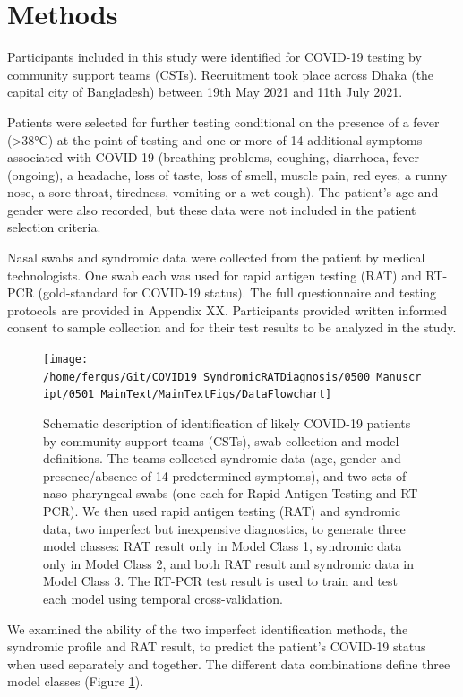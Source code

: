\documentclass[]{elsarticle} %
\begin{document}
\hypertarget{methods}{%
\section{Methods}\label{methods}}

Participants included in this study were identified for COVID-19 testing by community support teams (CSTs).
Recruitment took place across Dhaka (the capital city of Bangladesh) between 19th May 2021 and 11th July 2021.

Patients were selected for further testing conditional on the presence of a fever (\textgreater38°C) at the point of testing and one or more of 14 additional symptoms associated with COVID-19 (breathing problems, coughing, diarrhoea, fever (ongoing), a headache, loss of taste, loss of smell, muscle pain, red eyes, a runny nose, a sore throat, tiredness, vomiting or a wet cough).
The patient's age and gender were also recorded, but these data were not included in the patient selection criteria.

Nasal swabs and syndromic data were collected from the patient by medical technologists.
One swab each was used for rapid antigen testing (RAT) and RT-PCR (gold-standard for COVID-19 status).
The full questionnaire and testing protocols are provided in Appendix XX.
Participants provided written informed consent to sample collection and for their test results to be analyzed in the study.

\begin{figure}
\texttt{[image: /home/fergus/Git/COVID19\_SyndromicRATDiagnosis/0500\_Manuscript/0501\_MainText/MainTextFigs/DataFlowchart]} \caption{Schematic description of identification of likely COVID-19 patients by community support teams (CSTs), swab collection and model definitions. The teams collected syndromic data (age, gender and presence/absence of 14 predetermined symptoms), and two sets of naso-pharyngeal swabs (one each for Rapid Antigen Testing and RT-PCR). We then used rapid antigen testing (RAT) and syndromic data, two imperfect but inexpensive diagnostics, to generate three model classes: RAT result only in Model Class 1, syndromic data only in Model Class 2, and both RAT result and syndromic data in Model Class 3. The RT-PCR test result is used to train and test each model using temporal cross-validation.}\label{fig:data-flowchart}
\end{figure}

We examined the ability of the two imperfect identification methods, the syndromic profile and RAT result, to predict the patient's COVID-19 status when used separately and together.
The different data combinations define three model classes (Figure \ref{fig:data-flowchart}).
\end{document}
